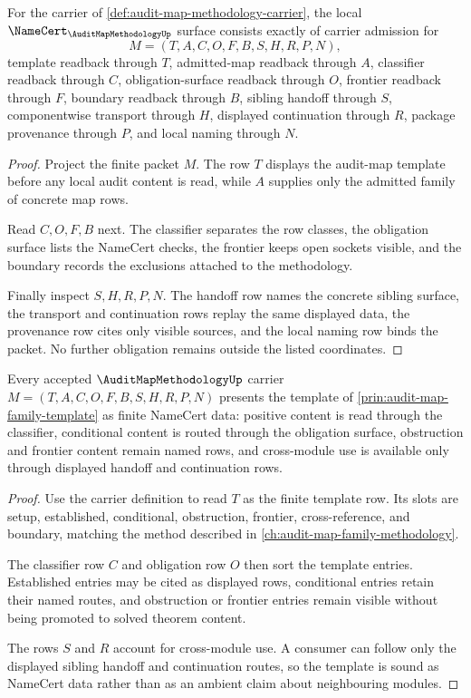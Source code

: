 \begin{theorem}
\label{thm:audit-map-methodology-obligation-surface}
For the carrier of \autoref{def:audit-map-methodology-carrier}, the local
$\NameCert_{\AuditMapMethodologyUp}$ surface consists exactly of carrier
admission for
$$
M=(T,A,C,O,F,B,S,H,R,P,N),
$$
template readback through $T$, admitted-map readback through $A$, classifier
readback through $C$, obligation-surface readback through $O$, frontier
readback through $F$, boundary readback through $B$, sibling handoff through
$S$, componentwise transport through $H$, displayed continuation through $R$,
package provenance through $P$, and local naming through $N$.
\end{theorem}
\begin{proof}
Project the finite packet $M$. The row $T$ displays the audit-map template
before any local audit content is read, while $A$ supplies only the admitted
family of concrete map rows.

Read $C,O,F,B$ next. The classifier separates the row classes, the obligation
surface lists the NameCert checks, the frontier keeps open sockets visible,
and the boundary records the exclusions attached to the methodology.

Finally inspect $S,H,R,P,N$. The handoff row names the concrete sibling
surface, the transport and continuation rows replay the same displayed data,
the provenance row cites only visible sources, and the local naming row binds
the packet. No further obligation remains outside the listed coordinates.
\end{proof}

\begin{theorem}
\label{thm:audit-map-methodology-template-soundness}
Every accepted $\AuditMapMethodologyUp$ carrier
$M=(T,A,C,O,F,B,S,H,R,P,N)$ presents the template of
\autoref{prin:audit-map-family-template} as finite NameCert data: positive
content is read through the classifier, conditional content is routed through
the obligation surface, obstruction and frontier content remain named rows,
and cross-module use is available only through displayed handoff and
continuation rows.
\end{theorem}
\begin{proof}
Use the carrier definition to read $T$ as the finite template row. Its slots
are setup, established, conditional, obstruction, frontier, cross-reference,
and boundary, matching the method described in
\autoref{ch:audit-map-family-methodology}.

The classifier row $C$ and obligation row $O$ then sort the template entries.
Established entries may be cited as displayed rows, conditional entries retain
their named routes, and obstruction or frontier entries remain visible without
being promoted to solved theorem content.

The rows $S$ and $R$ account for cross-module use. A consumer can follow only
the displayed sibling handoff and continuation routes, so the template is
sound as NameCert data rather than as an ambient claim about neighbouring
modules.
\end{proof}

